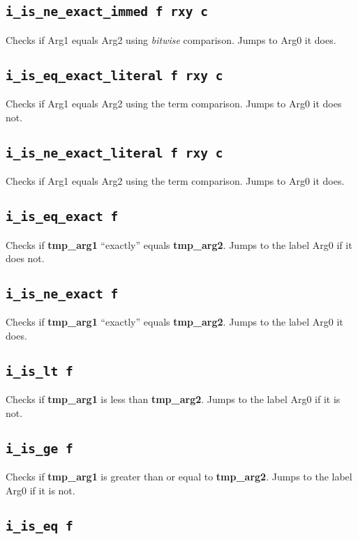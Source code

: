 \documentclass{article}
\newcommand{\tmpa}{\textbf{tmp\_arg1}}
\newcommand{\tmpb}{\textbf{tmp\_arg2}}
\newcommand{\iop}[1]{\texttt{#1}}
\begin{document}
\subsection*{\iop{i\_is\_ne\_exact\_immed f rxy c}}

Checks if Arg1 equals Arg2 using \emph{bitwise} comparison. Jumps to Arg0 it
does.

\subsection*{\iop{i\_is\_eq\_exact\_literal f rxy c}}

Checks if Arg1 equals Arg2 using the term comparison. Jumps to Arg0 it does not.

\subsection*{\iop{i\_is\_ne\_exact\_literal f rxy c}}

Checks if Arg1 equals Arg2 using the term comparison. Jumps to Arg0 it does.

\subsection*{\iop{i\_is\_eq\_exact f}}

Checks if \tmpa{} ``exactly'' equals \tmpb{}. Jumps to the label Arg0 if it does
not.

\subsection*{\iop{i\_is\_ne\_exact f}}

Checks if \tmpa{} ``exactly'' equals \tmpb{}. Jumps to the label Arg0 it does.

\subsection*{\iop{i\_is\_lt f}}

Checks if \tmpa{} is less than \tmpb{}. Jumps to the label Arg0 if it is not.

\subsection*{\iop{i\_is\_ge f}}

Checks if \tmpa{} is greater than or equal to \tmpb{}. Jumps to the label Arg0
if it is not.

\subsection*{\iop{i\_is\_eq f}}
\end{document}
